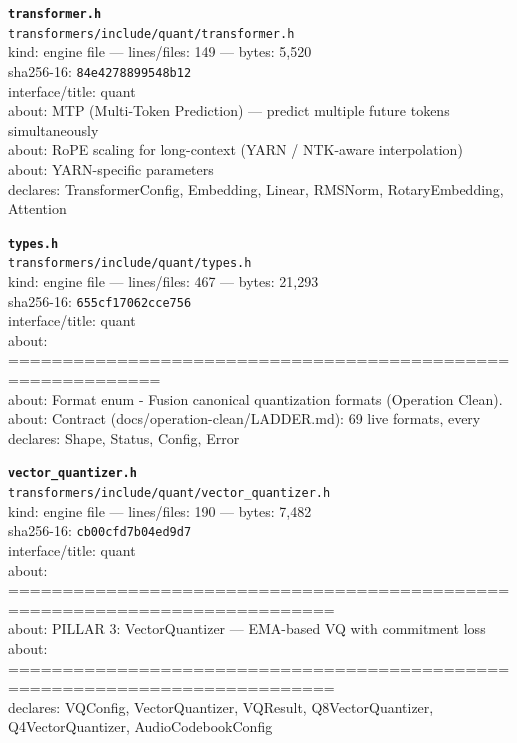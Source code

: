 \noindent\textbf{\texttt{transformer.h}}\\
\texttt{transformers/include/quant/transformer.h}\\
kind: engine file --- lines/files: 149 --- bytes: 5,520\\
sha256-16: \texttt{84e4278899548b12}\\
interface/title: quant\\
about: MTP (Multi-Token Prediction) — predict multiple future tokens simultaneously\\
about: RoPE scaling for long-context (YARN / NTK-aware interpolation)\\
about: YARN-specific parameters\\
declares: TransformerConfig, Embedding, Linear, RMSNorm, RotaryEmbedding, Attention\\
\vspace*{6.0pt}

\noindent\textbf{\texttt{types.h}}\\
\texttt{transformers/include/quant/types.h}\\
kind: engine file --- lines/files: 467 --- bytes: 21,293\\
sha256-16: \texttt{655cf17062cce756}\\
interface/title: quant\\
about: ============================================================\\
about: Format enum - Fusion canonical quantization formats (Operation Clean).\\
about: Contract (docs/operation-clean/LADDER.md): 69 live formats, every\\
declares: Shape, Status, Config, Error\\
\vspace*{6.0pt}

\noindent\textbf{\texttt{vector\_quantizer.h}}\\
\texttt{transformers/include/quant/vector\_quantizer.h}\\
kind: engine file --- lines/files: 190 --- bytes: 7,482\\
sha256-16: \texttt{cb00cfd7b04ed9d7}\\
interface/title: quant\\
about: ============================================================================\\
about: PILLAR 3: VectorQuantizer — EMA-based VQ with commitment loss\\
about: ============================================================================\\
declares: VQConfig, VectorQuantizer, VQResult, Q8VectorQuantizer, Q4VectorQuantizer, AudioCodebookConfig\\
\vspace*{6.0pt}

